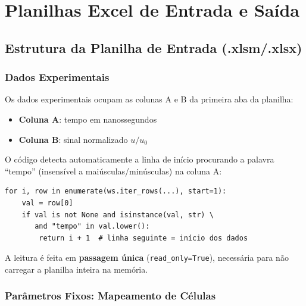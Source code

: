 \documentclass[12pt,a4paper]{report}
\begin{document}
\chapter{Planilhas Excel de Entrada e Saída}
\label{cap:excel}

\section{Estrutura da Planilha de Entrada (.xlsm/.xlsx)}

\subsection{Dados Experimentais}

Os dados experimentais ocupam as colunas A e B da primeira aba da planilha:
\begin{itemize}
  \item \textbf{Coluna A}: tempo em nanossegundos
  \item \textbf{Coluna B}: sinal normalizado $u/u_0$
\end{itemize}

O código detecta automaticamente a linha de início procurando a palavra
``tempo'' (insensível a maiúsculas/minúsculas) na coluna A:

\begin{lstlisting}[caption={Detecção automática da linha de início}]
for i, row in enumerate(ws.iter_rows(...), start=1):
    val = row[0]
    if val is not None and isinstance(val, str) \
       and "tempo" in val.lower():
        return i + 1  # linha seguinte = início dos dados
\end{lstlisting}

A leitura é feita em \textbf{passagem única} (\texttt{read\_only=True}),
necessária para não carregar a planilha inteira na memória.

\subsection{Parâmetros Fixos: Mapeamento de Células}
\end{document}
